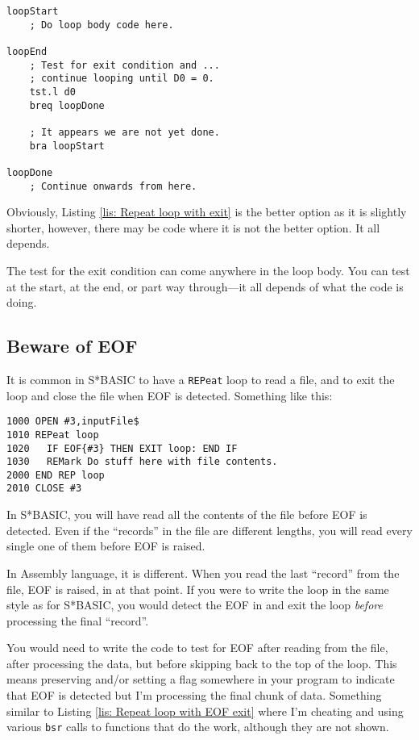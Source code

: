 \begin{lstlisting}[caption={Repeat loops with alternative exit in Assembly Code},label={lis: Repeat loop with alternative exit}]
loopStart
    ; Do loop body code here.

loopEnd
    ; Test for exit condition and ...
    ; continue looping until D0 = 0.
    tst.l d0
    breq loopDone

    ; It appears we are not yet done.
    bra loopStart

loopDone
    ; Continue onwards from here.
\end{lstlisting}

Obviously, Listing \ref{lis: Repeat loop with exit} is the better option as it is slightly shorter, however, there may be code where it is not the better option. It all depends.

The test for the exit condition can come anywhere in the loop body. You can test at the start, at the end, or part way through---it all depends of what the code is doing.

\subsection{Beware of EOF}

It is common in S*BASIC to have a \texttt{REPeat} loop to read a file, and to exit the loop and close the file when EOF is detected. Something like this:

\begin{lstlisting}
1000 OPEN #3,inputFile$
1010 REPeat loop
1020   IF EOF{#3} THEN EXIT loop: END IF
1030   REMark Do stuff here with file contents.
2000 END REP loop
2010 CLOSE #3
\end{lstlisting}

In S*BASIC, you will have read all the contents of the file before EOF is detected. Even if the ``records'' in the file are different lengths, you will read every single one of them before EOF is raised.

In Assembly language, it is different. When you read the last ``record'' from the file, EOF is raised, in  at that point. If you were to write the loop in the same style as for S*BASIC, you would detect the EOF in  and exit the loop \emph{before} processing the final ``record''.

You would need to write the code to test for EOF after reading from the file, after processing the data, but before skipping back to the top of the loop. This means preserving  and/or setting a flag somewhere in your program to indicate that EOF is detected but I'm processing the final chunk of data. Something similar to Listing \ref{lis: Repeat loop with EOF exit} where I'm cheating and using various \texttt{bsr} calls to functions that do the work, although they are not shown.

